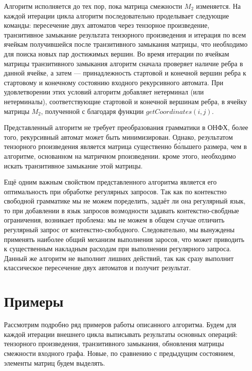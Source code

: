 Алгоритм исполняется до тех пор, пока матрица смежности $M_2$ изменяется.
На каждой итерации цикла алгоритм последовательно проделывает следующие команды: пересечение двух автоматов через тензорное произведение, транзитивное замыкание результата тензорного произведения и итерация по всем ячейкам получившейся после транзитивного замыкания матрицы, что необходимо для поиска новых пар достижимых вершин.
Во время итерации по ячейкам матрицы транзитивного замыкания алгоритм сначала проверяет наличие ребра в данной ячейке, а затем --- принадлежность стартовой и конечной вершин ребра к стартовому и конечному состоянию входного рекурсивного автомата.
При удовлетворении этих условий алгоритм добавляет нетерминал (или нетерминалы), соответствующие стартовой и конечной вершинам ребра, в ячейку матрицы $M_2$, полученной с благодаря функции $getCoordinates(i,j)$.

Представленный алгоритм не требует преобразования грамматики в ОНФХ, более того, рекурсивный автомат может быть минимизирован. Однако, результатом тензорного рпоизведения является матрица существенно б\'{о}льшего размера, чем в алгоритме, основанном на матричном рпоизведении. кроме этого, необходимо искать транзитивное замыкание этой матрицы.

Ещё одним важным свойством представленного алгоритма является его оптимальность при обработке регулярных запросов. Так как по контекстно свободной грамматике мы не можем поределить, задаёт ли она регулярный язык, то при добавлении в язык запросов возмодности задавать контекстно-свобдные ограничения, возникает проблема: мы не можем в общем случае отличить регулярный запрос от контекстно-свободного. Следовательно, мы вынуждены применять наиболее общий механизм выполнения заросов, что может приводить к существенным накладным расходам при выполнении регулярного запроса. Данный же алгоритм не выполнит лишних действий, так как сразу выполнит классическое пересечение двух автоматов и получит результат.

\section{Примеры}

Рассмотрим подробно ряд примеров работы описанного алгоритма.
Будем для каждой итерации внешнего цикла выписывать результаты основных операций: тензорного произведения, транзитивного замыкания, обновления матрицы смежности входного графа.
Новые, по сравнению с предыдущим состоянием, элементы матриц будем выделять.

